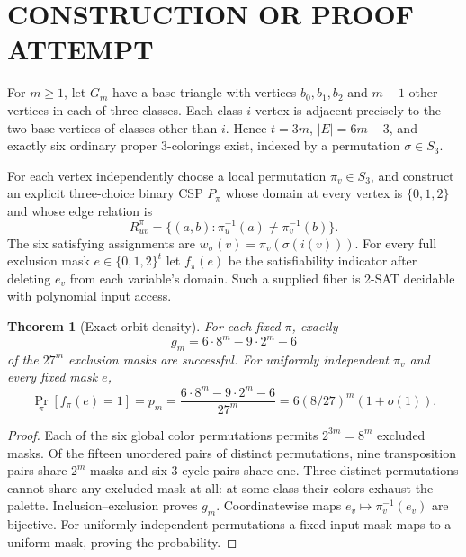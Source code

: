 \documentclass[11pt]{article}
\newtheorem{theorem}{Theorem}
\begin{document}
\section{CONSTRUCTION OR PROOF ATTEMPT}
For $m\ge1$, let $G_m$ have a base triangle with vertices $b_0,b_1,b_2$ and $m-1$ other vertices in each of three classes. Each class-$i$ vertex is adjacent precisely to the two base vertices of classes other than $i$. Hence $t=3m$, $|E|=6m-3$, and exactly six ordinary proper 3-colorings exist, indexed by a permutation $\sigma\in S_3$.

For each vertex independently choose a local permutation $\pi_v\in S_3$, and construct an explicit three-choice binary CSP $P_\pi$ whose domain at every vertex is $\{0,1,2\}$ and whose edge relation is
\[
R^\pi_{uv}=\{(a,b):\pi_u^{-1}(a)\ne\pi_v^{-1}(b)\}.
\]
The six satisfying assignments are $w_\sigma(v)=\pi_v(\sigma(i(v)))$. For every full exclusion mask $e\in\{0,1,2\}^t$ let $f_\pi(e)$ be the satisfiability indicator after deleting $e_v$ from each variable's domain. Such a supplied fiber is 2-SAT decidable with polynomial input access.

\begin{theorem}[Exact orbit density]
For each fixed $\pi$, exactly
\[
g_m=6\cdot8^m-9\cdot2^m-6
\]
of the $27^m$ exclusion masks are successful. For uniformly independent $\pi_v$ and \emph{every fixed} mask $e$,
\[
\Pr_\pi[f_\pi(e)=1]=p_m=\frac{6\cdot8^m-9\cdot2^m-6}{27^m}
=6(8/27)^m(1+o(1)).
\]
\end{theorem}
\begin{proof}
Each of the six global color permutations permits $2^{3m}=8^m$ excluded masks. Of the fifteen unordered pairs of distinct permutations, nine transposition pairs share $2^m$ masks and six 3-cycle pairs share one. Three distinct permutations cannot share any excluded mask at all: at some class their colors exhaust the palette. Inclusion--exclusion proves $g_m$. Coordinatewise maps $e_v\mapsto\pi_v^{-1}(e_v)$ are bijective. For uniformly independent permutations a fixed input mask maps to a uniform mask, proving the probability.
\end{proof}
\end{document}
